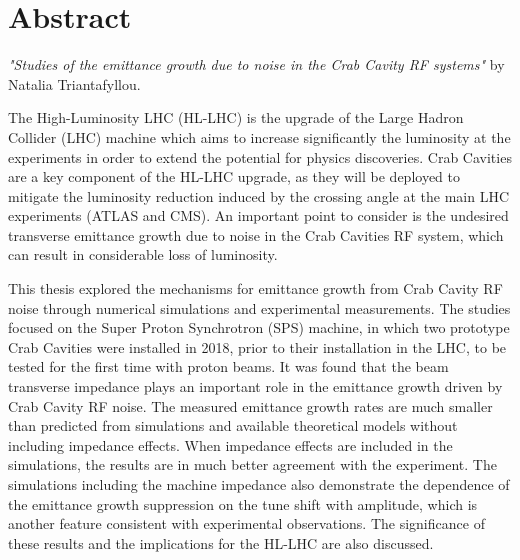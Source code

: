 \cleardoublepage
\chapter*{Abstract}

\textit{"Studies of the emittance growth due to noise in the Crab Cavity RF systems"} by Natalia Triantafyllou.

The High-Luminosity LHC (HL-LHC) is the upgrade of the Large Hadron Collider (LHC) machine which aims to increase significantly the luminosity at the experiments in order to extend the potential for physics discoveries. Crab Cavities are a key component of the HL-LHC upgrade, as they will be deployed to mitigate the luminosity reduction induced by the crossing angle at the main LHC experiments (ATLAS and CMS). An important point to consider is the undesired transverse emittance growth due to noise in the Crab Cavities RF system, which can result in considerable loss of luminosity.

This thesis explored the mechanisms for emittance growth from Crab Cavity RF noise through numerical simulations and experimental measurements. The studies focused on the Super Proton Synchrotron (SPS) machine, in which two prototype Crab Cavities were installed in 2018, prior to their installation in the LHC, to be tested for the first time with proton beams. It was found that the beam transverse impedance plays an important role in the emittance growth driven by Crab Cavity RF noise. The measured emittance growth rates are much smaller than predicted from simulations and available theoretical models without including impedance effects. When impedance effects are included in the simulations, the results are in much better agreement with the experiment. The simulations including the machine impedance also demonstrate the dependence of the emittance growth suppression on the tune shift with amplitude, which is another feature consistent with experimental observations. The significance of these results and the implications for the HL-LHC are also discussed.





